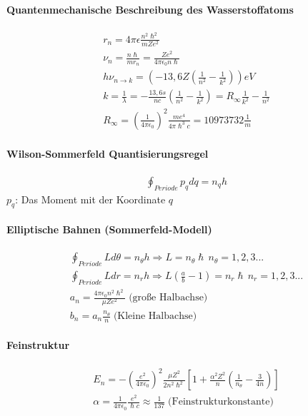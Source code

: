 \documentclass[10pt,a4paper]{article}
\begin{document}
\paragraph{Quantenmechanische Beschreibung des Wasserstoffatoms}$\;$ \\
\begin{align}
r_n = 4 \pi \epsilon \frac{n^2 \hslash^2}{mZe^2}\\
\nu_n = \frac{n\hslash}{m r_n} = \frac{Ze^2}{4\pi \epsilon_0 n \hslash}\\
h\nu_{n\rightarrow k} = \left(-13,6 Z \left(\frac{1}{n^2}-\frac{1}{k^2}\right)\right)eV\\
k=\frac{1}{\lambda} =- \frac{13,6 s}{nc}\left(\frac{1}{n^2}-\frac{1}{k^2}\right) = R_\infty \frac{1}{k^2}-\frac{1}{n^2}\\
R_\infty = \left(\frac{1}{4\pi \epsilon_0}\right)^2\frac{me^4}{4\pi \hslash^3 c}= 10973732 \frac{1}{m}
\end{align}
\paragraph{Wilson-Sommerfeld Quantisierungsregel}$\,$\\
\begin{align}
\oint_{Periode} p_q dq = n_qh
\end{align}
$p_q$: Das Moment mit der Koordinate $q$\\
\paragraph{Elliptische Bahnen (Sommerfeld-Modell)}$\,$\\
\begin{align}
\oint_{Periode} Ld\theta = n_\theta h \Rightarrow L= n_\theta \hslash \, n_\theta = 1,2,3...\\
\oint_{Periode} Ldr = n_r h \Rightarrow L\left(\frac{a}{b}-1\right)= n_r \hslash \, n_r = 1,2,3...\\
a_n = \frac{4\pi \epsilon_0 n^2 \hslash^2}{\mu Z e^2} \; \text{(große Halbachse)}\\
b_n= a_n \frac{n_\theta}{n}\; \text{(Kleine Halbachse)}
\end{align}
\paragraph{Feinstruktur}$\,$\\
\begin{align}
E_n = - \left(\frac{e^2}{4\pi\epsilon_0}\right)^2 \frac{\mu Z^2}{2n^2\hslash^2}\left[1+\frac{\alpha^2 Z^2}{n}\left(\frac{1}{n_\theta}-\frac{3}{4n}\right)\right]\\
\alpha = \frac{1}{4\pi \epsilon_0}\frac{e^2}{\hslash c}\approx \frac{1}{137} \; \text{(Feinstrukturkonstante)}
\end{align}
\end{document}

